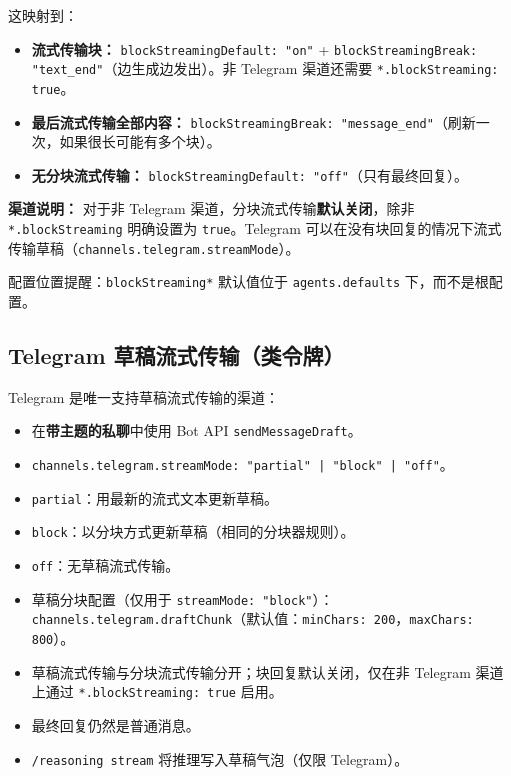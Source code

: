 这映射到：

\begin{itemize}
  \item \textbf{流式传输块：} \texttt{blockStreamingDefault: "on"} + \texttt{blockStreamingBreak: "text\_end"}（边生成边发出）。非 Telegram 渠道还需要 \texttt{*.blockStreaming: true}。
  \item \textbf{最后流式传输全部内容：} \texttt{blockStreamingBreak: "message\_end"}（刷新一次，如果很长可能有多个块）。
  \item \textbf{无分块流式传输：} \texttt{blockStreamingDefault: "off"}（只有最终回复）。
\end{itemize}


\textbf{渠道说明：} 对于非 Telegram 渠道，分块流式传输\textbf{默认关闭}，除非 \texttt{*.blockStreaming} 明确设置为 \texttt{true}。Telegram 可以在没有块回复的情况下流式传输草稿（\texttt{channels.telegram.streamMode}）。

配置位置提醒：\texttt{blockStreaming*} 默认值位于 \texttt{agents.defaults} 下，而不是根配置。

\subsection{Telegram 草稿流式传输（类令牌）}


Telegram 是唯一支持草稿流式传输的渠道：

\begin{itemize}
  \item 在\textbf{带主题的私聊}中使用 Bot API \texttt{sendMessageDraft}。
  \item \texttt{channels.telegram.streamMode: "partial" | "block" | "off"}。
  \item \texttt{partial}：用最新的流式文本更新草稿。
  \item \texttt{block}：以分块方式更新草稿（相同的分块器规则）。
  \item \texttt{off}：无草稿流式传输。
  \item 草稿分块配置（仅用于 \texttt{streamMode: "block"}）：\texttt{channels.telegram.draftChunk}（默认值：\texttt{minChars: 200}，\texttt{maxChars: 800}）。
  \item 草稿流式传输与分块流式传输分开；块回复默认关闭，仅在非 Telegram 渠道上通过 \texttt{*.blockStreaming: true} 启用。
  \item 最终回复仍然是普通消息。
  \item \texttt{/reasoning stream} 将推理写入草稿气泡（仅限 Telegram）。
\end{itemize}



